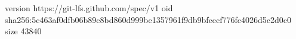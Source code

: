 version https://git-lfs.github.com/spec/v1
oid sha256:5c463af0dfb06b89c8bd860d999be1357961f9db9bfeecf776fc4026d5c2d0c0
size 43840
